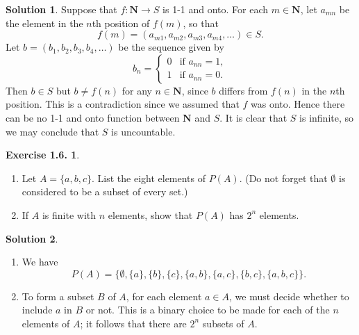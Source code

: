 \documentclass[12pt]{article}
\theoremstyle{definition}
\theoremstyle{exercise}
\newtheorem{exercise}{Exercise 1.6.}
\theoremstyle{solution}
\newtheorem*{solution}{Solution}
\newcommand{\N}{\mathbf{N}}
\begin{document}
\begin{solution}
    Suppose that \( f : \N \to S \) is 1-1 and onto. For each \( m \in \N \), let \( a_{mn} \) be the element in the \( n \)th position of \( f(m) \), so that
    \[
        f(m) = (a_{m1}, a_{m2}, a_{m3}, a_{m4}, \ldots) \in S.
    \]
    Let \( b = (b_1, b_2, b_3, b_4, \ldots) \) be the sequence given by
    \[
        b_n = \begin{cases}
            0 & \text{if } a_{nn} = 1, \\
            1 & \text{if } a_{nn} = 0.
        \end{cases}
    \]
    Then \( b \in S \) but \( b \neq f(n) \) for any \( n \in \N \), since \( b \) differs from \( f(n) \) in the \( n \)th position. This is a contradiction since we assumed that \( f \) was onto. Hence there can be no 1-1 and onto function between \( \N \) and \( S \). It is clear that \( S \) is infinite, so we may conclude that \( S \) is uncountable.
\end{solution}

\begin{exercise}
\label{ex:5}
    \begin{enumerate}
        \item Let \( A = \{ a, b, c \} \). List the eight elements of \( P(A) \). (Do not forget that \( \emptyset \) is considered to be a subset of every set.)

        \item If \( A \) is finite with \( n \) elements, show that \( P(A) \) has \( 2^n \) elements.
    \end{enumerate}
\end{exercise}

\begin{solution}
    \begin{enumerate}
        \item We have
        \[
            P(A) = \{ \emptyset, \{ a \}, \{ b \}, \{ c \}, \{ a, b \}, \{ a, c \}, \{ b, c \}, \{ a, b, c \} \}.
        \]

        \item To form a subset \( B \) of \( A \), for each element \( a \in A \), we must decide whether to include \( a \) in \( B \) or not. This is a binary choice to be made for each of the \( n \) elements of \( A \); it follows that there are \( 2^n \) subsets of \( A \).
    \end{enumerate}
\end{solution}
\end{document}

